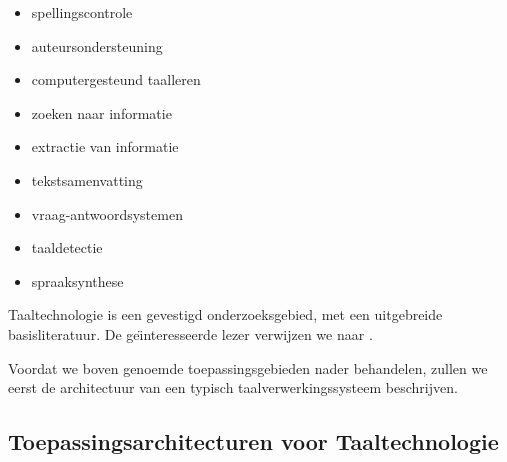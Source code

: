 \documentclass[]{../../metanetpaper}
\begin{document}
\begin{multicols}{2}
\begin{itemize}
\item spellingscontrole
\item auteursondersteuning
\item computergesteund taalleren
\item zoeken naar informatie
\item extractie van informatie
\item tekstsamenvatting
\item vraag-antwoordsystemen
\item taaldetectie
\item spraaksynthese
\end{itemize}

Taaltechnologie is een gevestigd onderzoeksgebied, met een uitgebreide basisliteratuur. De ge{\"\i}nteresseerde lezer verwijzen we naar
\cite{carstensen-etal1, jurafsky-martin01, manning-schuetze1, lt-world1, lt-survey1}.

Voordat we boven genoemde toepassingsgebieden nader behandelen, zullen we eerst de architectuur van een typisch taalverwerkingssysteem beschrijven.

\subsection[Toepassingsarchitecturen voor Taaltechnologie]{Toepassingsarchitecturen voor Taaltechnologie}


\end{multicols}
\end{document}
